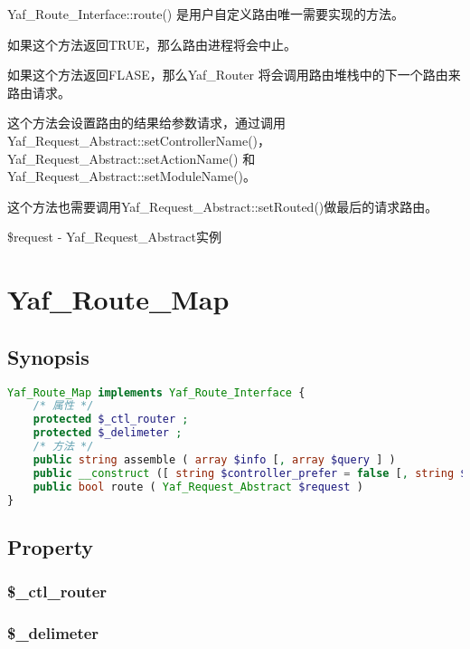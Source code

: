 Yaf\_Route\_Interface::route() 是用户自定义路由唯一需要实现的方法。

\begin{compactitem}
\item 如果这个方法返回TRUE，那么路由进程将会中止。
\item 如果这个方法返回FLASE，那么Yaf\_Router 将会调用路由堆栈中的下一个路由来路由请求。
\end{compactitem}

这个方法会设置路由的结果给参数请求，通过调用Yaf\_Request\_Abstract::setControllerName()，Yaf\_Request\_Abstract::setActionName() 和 Yaf\_Request\_Abstract::setModuleName()。

这个方法也需要调用Yaf\_Request\_Abstract::setRouted()做最后的请求路由。

\begin{compactitem}
\item \$request - Yaf\_Request\_Abstract实例
\end{compactitem}


\chapter{Yaf\_Route\_Map}

\section{Synopsis}

\begin{lstlisting}[language=PHP]
Yaf_Route_Map implements Yaf_Route_Interface {
    /* 属性 */
    protected $_ctl_router ;
    protected $_delimeter ;
    /* 方法 */
    public string assemble ( array $info [, array $query ] )
    public __construct ([ string $controller_prefer = false [, string $delimiter = '' ]] )
    public bool route ( Yaf_Request_Abstract $request )
}
\end{lstlisting}

\section{Property}


\subsection{\$\_ctl\_router}



\subsection{\$\_delimeter}


